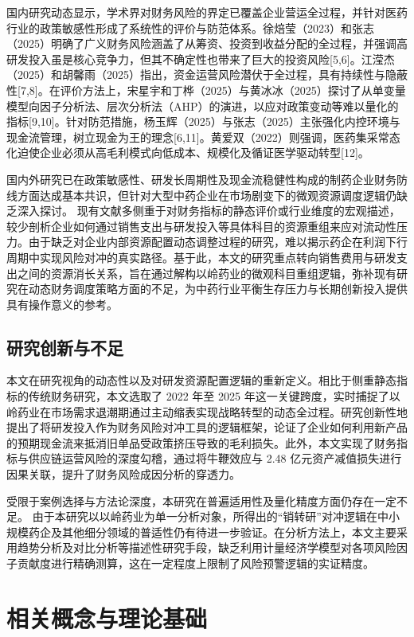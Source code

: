 \documentclass[12pt,a4paper,fontset=windows,UTF8]{ctexart}
\begin{document}
国内研究动态显示，学术界对财务风险的界定已覆盖企业营运全过程，并针对医药行业的政策敏感性形成了系统性的评价与防范体系。徐焙莹（2023）和张志（2025）明确了广义财务风险涵盖了从筹资、投资到收益分配的全过程，并强调高研发投入虽是核心竞争力，但其不确定性也带来了巨大的投资风险[5,6]。江滢杰（2025）和胡馨雨（2025）指出，资金运营风险潜伏于全过程，具有持续性与隐蔽性[7,8]。在评价方法上，宋星宇和丁桦（2025）与黄冰冰（2025）探讨了从单变量模型向因子分析法、层次分析法（AHP）的演进，以应对政策变动等难以量化的指标[9,10]。针对防范措施，杨玉辉（2025）与张志（2025）主张强化内控环境与现金流管理，树立现金为王的理念[6,11]。黄爱双（2022）则强调，医药集采常态化迫使企业必须从高毛利模式向低成本、规模化及循证医学驱动转型[12]。

国内外研究已在政策敏感性、研发长周期性及现金流稳健性构成的制药企业财务防线方面达成基本共识，但针对大型中药企业在市场剧变下的微观资源调度逻辑仍缺乏深入探讨。 现有文献多侧重于对财务指标的静态评价或行业维度的宏观描述，较少剖析企业如何通过销售支出与研发投入等具体科目的资源重组来应对流动性压力。由于缺乏对企业内部资源配置动态调整过程的研究，难以揭示药企在利润下行周期中实现风险对冲的真实路径。基于此，本文的研究重点转向销售费用与研发支出之间的资源消长关系，旨在通过解构以岭药业的微观科目重组逻辑，弥补现有研究在动态财务调度策略方面的不足，为中药行业平衡生存压力与长期创新投入提供具有操作意义的参考。

\subsection{研究创新与不足}
本文在研究视角的动态性以及对研发资源配置逻辑的重新定义。相比于侧重静态指标的传统财务研究，本文选取了 2022 年至 2025 年这一关键跨度，实时捕捉了以岭药业在市场需求退潮期通过主动缩表实现战略转型的动态全过程。研究创新性地提出了将研发投入作为财务风险对冲工具的逻辑框架，论证了企业如何利用新产品的预期现金流来抵消旧单品受政策挤压导致的毛利损失。此外，本文实现了财务指标与供应链运营风险的深度勾稽，通过将牛鞭效应与 2.48 亿元资产减值损失进行因果关联，提升了财务风险成因分析的穿透力。

受限于案例选择与方法论深度，本研究在普遍适用性及量化精度方面仍存在一定不足。 由于本研究以以岭药业为单一分析对象，所得出的“销转研”对冲逻辑在中小规模药企及其他细分领域的普适性仍有待进一步验证。在分析方法上，本文主要采用趋势分析及对比分析等描述性研究手段，缺乏利用计量经济学模型对各项风险因子贡献度进行精确测算，这在一定程度上限制了风险预警逻辑的实证精度。

\section{相关概念与理论基础}
\end{document}
